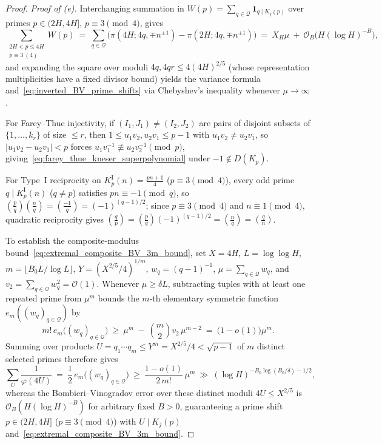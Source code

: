 \documentclass[11pt, a4paper]{article}
\theoremstyle{plain}
\theoremstyle{definition}
\newcommand{\leg}[2]{\left(\frac{#1}{#2}\right)}
\begin{document}
\begin{proof}
\medskip\noindent\emph{Proof of (e).} Interchanging summation in $W(p)=\sum_{q\in\mathcal{Q}}\mathbf{1}_{q\mid K_j(p)}$ over primes $p\in(2H,4H]$, $p\equiv3\pmod 4$, gives
\[
\sum_{\substack{2H<p\le 4H\\ p\equiv 3\ (4)}}W(p)\ =\ \sum_{q\in\mathcal{Q}}\Big(\pi(4H;4q,\mp n^{\pm1})-\pi(2H;4q,\mp n^{\pm1})\Big)\ =\ X_H\mu\ +\ \mathcal{O}_B\big(H(\log H)^{-B}\big),
\]
and expanding the square over moduli $4q,4qr\le 4(4H)^{2/5}$ (whose representation multiplicities have a fixed divisor bound) yields the variance formula and~\eqref{eq:inverted_BV_prime_shifts} via Chebyshev's inequality whenever $\mu\to\infty$.

For Farey--Thue injectivity, if $(I_1,J_1)\neq(I_2,J_2)$ are pairs of disjoint subsets of $\{1,\dots,k_r\}$ of size $\le r$, then $1\le u_1 v_2,u_2 v_1\le p-1$ with $u_1 v_2\neq u_2 v_1$, so $|u_1 v_2-u_2 v_1|<p$ forces $u_1 v_1^{-1}\not\equiv u_2 v_2^{-1}\pmod p$, giving~\eqref{eq:farey_thue_kneser_superpolynomial} under $-1\notin D(K_p)$.

For Type~I reciprocity on $K_p^{\mathrm{I}}(n)=\frac{pn+1}{4}$ ($p\equiv3\pmod 4$), every odd prime $q\mid K_p^{\mathrm{I}}(n)$ ($q\neq p$) satisfies $pn\equiv-1\pmod q$, so $\leg{p}{q}\leg{n}{q}=\leg{-1}{q}=(-1)^{(q-1)/2}$; since $p\equiv3\pmod 4$ and $n\equiv1\pmod 4$, quadratic reciprocity gives $\leg{q}{p}=\leg{p}{q}(-1)^{(q-1)/2}=\leg{n}{q}=\leg{q}{n}$.

To establish the composite-modulus bound~\eqref{eq:extremal_composite_BV_3m_bound}, set $X=4H$, $L=\log\log H$, $m=\allowbreak\lfloor B_0 L/\allowbreak\log L\rfloor$, $Y=(X^{2/5}/4)^{1/m}$, $w_q=(q-1)^{-1}$, $\mu=\sum_{q\in\mathcal{Q}}w_q$, and $v_2=\sum_{q\in\mathcal{Q}}w_q^{2}=\mathcal{O}(1)$. Whenever $\mu\ge\delta L$, subtracting tuples with at least one repeated prime from $\mu^{m}$ bounds the $m$-th elementary symmetric function $e_m((w_q)_{q\in\mathcal{Q}})$ by
\[
m!\,e_m\big((w_q)_{q\in\mathcal{Q}}\big)\ \ge\ \mu^{m}\ -\ \binom{m}{2}v_2\,\mu^{m-2}\ =\ \big(1-o(1)\big)\mu^{m}.
\]
Summing over products $U=q_1\cdots q_m\le Y^{m}=X^{2/5}/4<\sqrt{p-1}$ of $m$ distinct selected primes therefore gives
\[
\sum_{U}\frac{1}{\varphi(4U)}\ =\ \frac12\,e_m\big((w_q)_{q\in\mathcal{Q}}\big)\ \ge\ \frac{1-o(1)}{2\,m!}\,\mu^{m}\ \gg\ (\log H)^{-B_0\log(B_0/\delta)-1/2},
\]
whereas the Bombieri--Vinogradov error over these distinct moduli $4U\le X^{2/5}$ is $\mathcal{O}_B(H(\log H)^{-B})$ for arbitrary fixed $B>0$, guaranteeing a prime shift $p\in(2H,4H]$ ($p\equiv3\pmod 4$) with $U\mid K_j(p)$ and~\eqref{eq:extremal_composite_BV_3m_bound}.


\end{proof}
\end{document}
